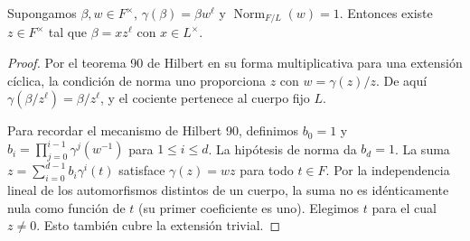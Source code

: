 \begin{lema}
\label{lem:cu-h90}
Supongamos $\beta,w\in F^\times$, $\gamma(\beta)=\beta w^\ell$ y $\operatorname{Norm}_{F/L}(w)=1$. Entonces existe $z\in F^\times$ tal que $\beta=xz^\ell$ con $x\in L^\times$.
\end{lema}
\begin{proof}
Por el teorema 90 de Hilbert en su forma multiplicativa para una extensión cíclica, la condición de norma uno proporciona $z$ con $w=\gamma(z)/z$. De aquí $\gamma(\beta/z^\ell)=\beta/z^\ell$, y el cociente pertenece al cuerpo fijo $L$.

Para recordar el mecanismo de Hilbert 90, definimos $b_0=1$ y $b_i=\prod_{j=0}^{i-1}\gamma^j(w^{-1})$ para $1\le i\le d$. La hipótesis de norma da $b_d=1$. La suma $z=\sum_{i=0}^{d-1}b_i\gamma^i(t)$ satisface $\gamma(z)=wz$ para todo $t\in F$. Por la independencia lineal de los automorfismos distintos de un cuerpo, la suma no es idénticamente nula como función de $t$ (su primer coeficiente es uno). Elegimos $t$ para el cual $z\ne0$. Esto también cubre la extensión trivial.
\end{proof}

